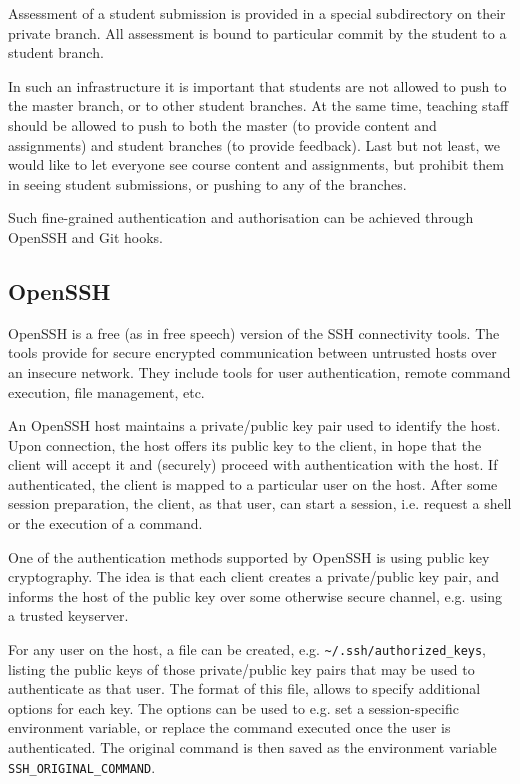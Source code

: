 Assessment of a student submission is provided in a special subdirectory on
their private branch. All assessment is bound to particular commit by the
student to a student branch.

In such an infrastructure it is important that students are not allowed to push
to the master branch, or to other student branches. At the same time, teaching
staff should be allowed to push to both the master (to provide content and
assignments) and student branches (to provide feedback). Last but not least, we
would like to let everyone see course content and assignments, but prohibit
them in seeing student submissions, or pushing to any of the branches.

Such fine-grained authentication and authorisation can be achieved through
OpenSSH and Git hooks.

\subsection{OpenSSH}

OpenSSH is a free (as in free speech) version of the SSH connectivity
tools\cite{openssh-com-2014}.  The tools provide for secure encrypted
communication between untrusted hosts over an insecure network\cite{man-1-ssh}.
They include tools for user authentication, remote command execution, file
management, etc.

An OpenSSH host maintains a private/public key pair used to identify the host.
Upon connection, the host offers its public key to the client, in hope that the
client will accept it and (securely) proceed with authentication with the host.
If authenticated, the client is mapped to a particular user on the host.  After
some session preparation, the client, as that user, can start a session, i.e.
request a shell or the execution of a command.

One of the authentication methods supported by OpenSSH is using public key
cryptography. The idea is that each client creates a private/public key pair,
and informs the host of the public key over some otherwise secure channel, e.g.
using a trusted keyserver.

For any user on the host, a file can be created, e.g.
\texttt{\textasciitilde/.ssh/authorized\_keys}, listing the public keys of
those private/public key pairs that may be used to authenticate as that user.
The format of this file\cite{man-8-sshd}, allows to specify additional options
for each key. The options can be used to e.g. set a session-specific
environment variable, or replace the command executed once the user is
authenticated. The original command is then saved as the environment variable
\texttt{SSH\_ORIGINAL\_COMMAND}.

